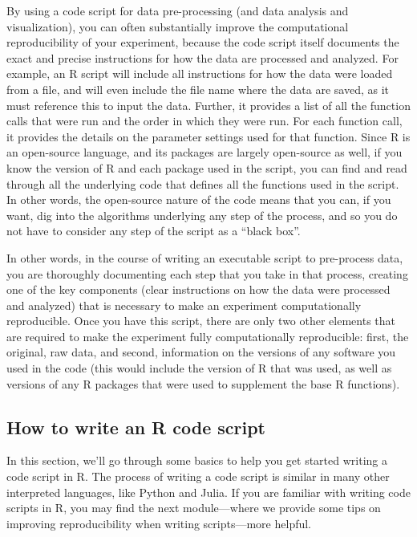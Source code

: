 \documentclass[]{tufte-book}
\begin{document}
By using a code script for data pre-processing (and data analysis and
visualization), you can often substantially improve the computational
reproducibility of your experiment, because the code script itself documents the
exact and precise instructions for how the data are processed and analyzed. For
example, an R script will include all instructions for how the data were loaded
from a file, and will even include the file name where the data are saved, as it
must reference this to input the data. Further, it provides a list of all the
function calls that were run and the order in which they were run. For each
function call, it provides the details on the parameter settings used for that
function. Since R is an open-source language, and its packages are largely
open-source as well, if you know the version of R and each package used in the
script, you can find and read through all the underlying code that defines all
the functions used in the script. In other words, the open-source nature of the
code means that you can, if you want, dig into the algorithms underlying any
step of the process, and so you do not have to consider any step of the script
as a ``black box''.

In other words, in the course of writing an executable script to pre-process
data, you are thoroughly documenting each step that you take in that process,
creating one of the key components (clear instructions on how the data were
processed and analyzed) that is necessary to make an experiment computationally
reproducible. Once you have this script, there are only two other elements
that are required to make the experiment fully computationally reproducible:
first, the original, raw data, and second, information on the versions of
any software you used in the code (this would include the version of R that
was used, as well as versions of any R packages that were used to
supplement the base R functions).

\subsection{How to write an R code script}\label{how-to-write-an-r-code-script}

In this section, we'll go through some basics to help you get started writing a
code script in R. The process of writing a code script is similar in many other
interpreted languages, like Python and Julia. If you are familiar with writing
code scripts in R, you may find the next module---where we provide some tips on
improving reproducibility when writing scripts---more helpful.
\end{document}
